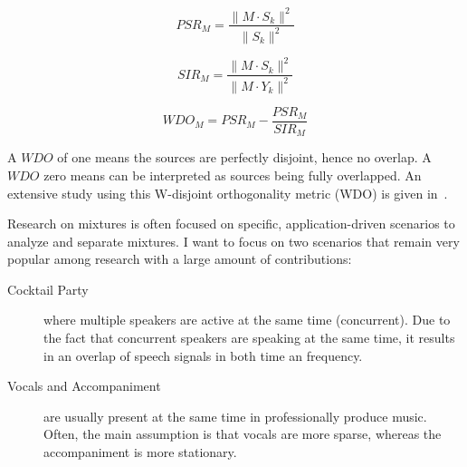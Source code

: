 \begin{equation}
    PSR_{M} = \frac{\|M \cdot S_{k}\|^{2}}{\|S_{k}\|^{2}}
\end{equation}

\begin{equation}
    SIR_{M}=\frac{\|M \cdot S_{k}\|^{2}}{\|M \cdot Y_{k}\|^{2}}
\end{equation}

\begin{equation}
    WDO_{M} = PSR_{M} - \frac{PSR_{M}}{SIR_{M}}
\end{equation}


A \(WDO\) of one means the sources are perfectly disjoint, hence no overlap.
A \(WDO\) zero means can be interpreted as sources being fully overlapped.
An extensive study using this W-disjoint orthogonality metric (WDO) is given in~\cite{rickard02}.
\par
Research on mixtures is often focused on specific, application-driven scenarios to analyze and separate mixtures.
I want to focus on two scenarios that remain very popular among research with a large amount of contributions:

\begin{description}
  \item[Cocktail Party] where multiple speakers are active at the same time (concurrent).
  Due to the fact that concurrent speakers are speaking at the same time, it results in an overlap of speech signals in both time an frequency.
  \item[Vocals and Accompaniment] are usually present at the same time in professionally produce music. 
  Often, the main assumption is that vocals are more sparse, whereas the accompaniment is more stationary.
\end{description}

